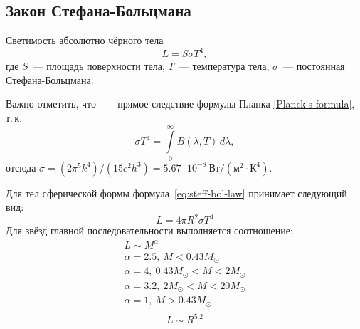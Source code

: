 \subsection{Закон Стефана-Больцмана}
Светимость абсолютно чёрного тела
	\begin{equation}
	L = S \sigma T^4,
	\label{eq:steff-bol-law}
\end{equation}
 где $S$~--- площадь поверхности тела, $T$~--- температура тела, $\sigma$~--- постоянная Стефана-Больцмана.
  
Важно отметить, что ~--- прямое следствие формулы Планка \eqref{Planck's formula}, т.\,к.\begin{equation}
	\sigma T^4 = \int\limits^\infty_0 B(\lambda, T)\,d\lambda,
\end{equation}
отсюда $\sigma = (2\pi^5k^4)/(15c^2h^3) = 5.67 \cdot 10^{-8}~\text{Вт}/(\text{м}^2\cdot \text{К}^4)$.


Для тел сферической формы формула~\eqref{eq:steff-bol-law} принимает следующий вид:
\begin{equation}
L=4\pi R^2\sigma T^4
\end{equation}
Для звёзд главной последовательности выполняется соотношение:
\begin{equation}
\begin{gathered}
L\sim M^{\alpha}\\ \alpha = 2.5, ~ M < 0.43 M_\odot\\ \alpha = 4, ~ 0.43 M_\odot < M < 2 M_\odot\\ \alpha = 3.2, ~ 2 M_\odot < M < 20 M_\odot\\ \alpha = 1, ~ M > 0.43M_\odot\\
\end{gathered}
\end{equation}
\begin{equation}
L\sim R^{5.2}
\end{equation}
